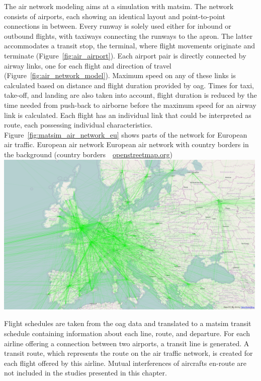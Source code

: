 The air network modeling aims at a simulation with \gls{matsim}.  
The network consists of airports, each showing an identical layout and point-to-point connections in between. 
Every runway is solely used either for inbound or outbound flights, with taxiways connecting the runways to the apron. The latter accommodates a transit stop, \ie the terminal, where flight movements originate and terminate (Figure~\ref{fig:air_airport}). 
Each airport pair is directly connected by airway links, one for each flight and direction of travel (Figure~\ref{fig:air_network_model}). 
Maximum speed on any of these links is calculated based on distance and flight duration provided by \gls{oag}. 
Times for taxi, take-off, and landing are also taken into account, \ie flight duration is reduced by the time needed from push-back to airborne before the maximum speed for an airway link is calculated.
Each flight has an individual link that could be interpreted as route, each possessing individual characteristics. 
Figure~\ref{fig:matsim_air_network_eu} shows parts of the network for European air traffic.
%
\createfigure%
{European air network}%
{European air network with country borders in the background (country borders~\textcopyright~\url{openstreetmap.org})}%
{\label{fig:matsim_air_network_eu}}%
{\includegraphics[width=0.99\textwidth, angle=0]{scenarios/figures/air_network_europe_osm.png}}%
{\citet{GretherFuerbasNagel2013FlightTechnologyPROCEDIA}}


Flight schedules are taken from the \gls{oag} data and translated to a \gls{matsim} transit schedule containing information about each line, route, and departure. 
For each airline offering a connection between two airports, a transit line is generated. 
A transit route, which represents the route on the air traffic network, is created for each flight offered by this airline. 
Mutual interferences of aircrafts en-route are not included in the studies presented in this chapter.


